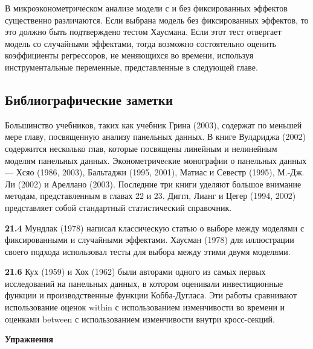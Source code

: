 В микроэконометрическом анализе модели с и без фиксированных эффектов существенно различаются. Если выбрана модель без фиксированных эффектов, то это должно быть подтверждено тестом Хаусмана. Если этот тест отвергает модель со случайными эффектами, тогда возможно состоятельно оценить коэффициенты  регрессоров, не меняющихся во времени,  используя инструментальные переменные, представленные в следующей главе.

\subsection{Библиографические заметки}

Большинство учебников, таких как учебник Грина (2003), содержат по меньшей мере главу, посвященную анализу панельных данных. В книге Вулдриджа (2002) содержится несколько глав, которые посвящены линейным и нелинейным моделям панельных данных. Эконометричеcкие монографии о панельных данных  --- Хсяо (1986, 2003), Бальтаджи (1995, 2001), Матиас и Севестр (1995), М.-Дж. Ли (2002) и Ареллано (2003). Последние три книги уделяют большое внимание методам, представленным в главах 22 и 23. Диггл, Лианг и Цегер (1994, 2002) представляет собой стандартный статистический справочник.

\textbf{21.4} Мундлак (1978) написал классическую статью о выборе между моделями с фиксированными и случайными эффектами. Хаусман (1978) для иллюстрации своего подхода использовал тесты для выбора между этими двумя моделями.

\textbf{21.6} Кух (1959) и Хох (1962) были авторами одного из самых первых исследований на панельных данных, в котором оценивали инвестиционные функции и производственные функции Кобба-Дугласа. Эти работы сравнивают использование оценок within с использованием изменчивости во времени и оценками between с использованием изменчивости внутри кросс-секций.


 {\centering
{\bf Упражнения}\\}

